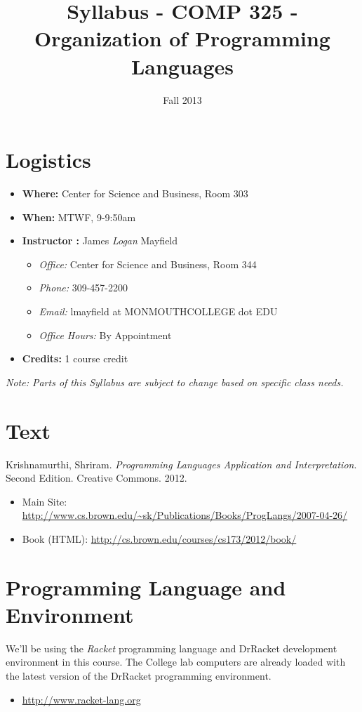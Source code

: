 \documentclass[10pt]{article}
\title{Syllabus - COMP 325 - Organization of Programming Languages}
\author{  }
\date{Fall 2013}
\begin{document}
\maketitle

\section{Logistics}
\begin{itemize}
\item \textbf{Where: } Center for Science and Business, Room 303
\item \textbf{When: } MTWF,  9-9:50am
\item \textbf{Instructor :} James \textit{Logan} Mayfield
\begin{itemize}
\item \textit{Office: } Center for Science and Business, Room 344
\item \textit{Phone: } 309-457-2200
\item \textit{Email: } lmayfield at MONMOUTHCOLLEGE dot EDU
\item \textit{Office Hours: } By Appointment
\end{itemize}
\item \textbf{Credits: } 1 course credit
\end{itemize}
\emph{Note: Parts of this Syllabus are subject to change based on specific class needs.}

\section{Text}
Krishnamurthi, Shriram. \textit{Programming Languages Application and Interpretation}. Second Edition. Creative Commons. 2012. 
\begin{itemize}
\item Main Site: \url{http://www.cs.brown.edu/~sk/Publications/Books/ProgLangs/2007-04-26/}
\item Book (HTML): \url{http://cs.brown.edu/courses/cs173/2012/book/}
\end{itemize}


\section{Programming Language and Environment}

We'll be using the \textit{Racket} programming language and DrRacket development environment in this course. The College lab computers are already loaded with the latest version of the DrRacket programming environment.    
\begin{itemize}
\item \url{http://www.racket-lang.org}
\end{itemize}
\end{document}
